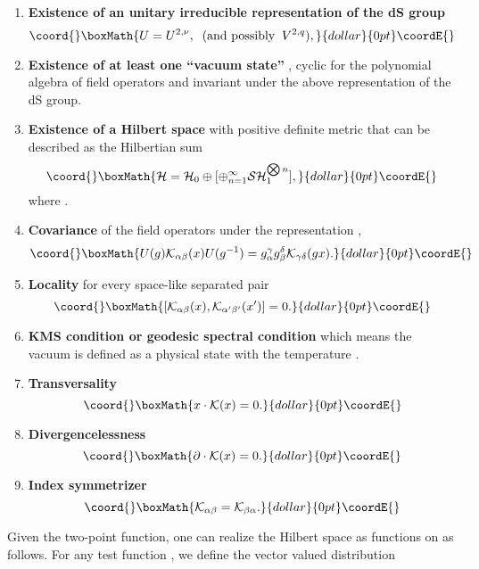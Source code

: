 \documentclass[a4paper,11pt,showpacs,preprintnumbers]{revtex4}
\def\setC{\mathbb{C}}
\begin{document}
\begin{enumerate}
\item {\bf Existence of an unitary irreducible
representation of
the dS group}
 $$\coord{}\boxMath{ U = U^{2,\nu},\;\; (\mbox{and possibly} \;\; V^{2,q}),}{dollar}{0pt}\coordE{}$$
\item {\bf Existence of at least one ``vacuum state''}
 \myHighlight{$\Omega$}\coordHE{},
cyclic for the polynomial algebra of field operators
and invariant
under the above representation of the dS group.
\item {\bf Existence of a Hilbert space} \coordHE{}
with positive definite metric that can be described as the
Hilbertian sum
$$\coord{}\boxMath{
{\cal H}={\cal H}_0\oplus[\oplus_{n=1}^{\infty}{\cal S}{\cal
H}_1^{\bigotimes n}],
}{dollar}{0pt}\coordE{}$$
where \myHighlight{${\cal H}_0=\{ \lambda \Omega,\;\; \lambda \in \setC\}$}\coordHE{}.
\item {\bf Covariance }
of the field operators under the representation \coordHE{},
$$\coord{}\boxMath{U(g){ \bf {\cal K}}_{\alpha\beta}(x) U(g^{-1})=
g_{\alpha}^{\gamma} g_{\beta}^{\delta}{\cal K}_{\gamma \delta}(g
x).}{dollar}{0pt}\coordE{}$$

\item{\bf Locality}
for every space-like separated pair \coordHE{}  $$\coord{}\boxMath{[{\cal K}_{\alpha\beta}(x),{\cal K}_{\alpha'\beta'}(x')]=0. }{dollar}{0pt}\coordE{}$$

\item {\bf KMS condition or geodesic spectral
condition} \cite{brmo}
which means the vacuum is defined as a physical state
with the
temperature \coordHE{}.

\item {\bf Transversality}
$$\coord{}\boxMath{ x\cdot {\cal K}(x)=0.}{dollar}{0pt}\coordE{}$$

\item {\bf Divergencelessness}
$$\coord{}\boxMath{ \partial\cdot {\cal K}(x)=0.}{dollar}{0pt}\coordE{}$$

\item {\bf Index symmetrizer}
$$\coord{}\boxMath{  {\cal K}_{\alpha \beta}={\cal K}_{\beta \alpha}. }{dollar}{0pt}\coordE{}$$
\end{enumerate}
Given the two-point function, one can realize the Hilbert space as
functions on \coordHE{} as follows. For any test function \coordHE{}, we define the vector valued distribution
\end{document}

